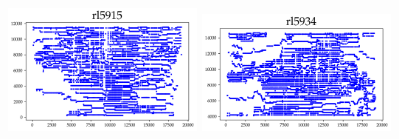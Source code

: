 \begin{appendices}
\begin{figure}[htbp]
\includegraphics[width=5cm]{../tsplib_euc2d_pictures_of_instances/rl5915.png}
\includegraphics[width=5cm]{../tsplib_euc2d_pictures_of_instances/rl5934.png}

\end{figure}


\end{appendices}
